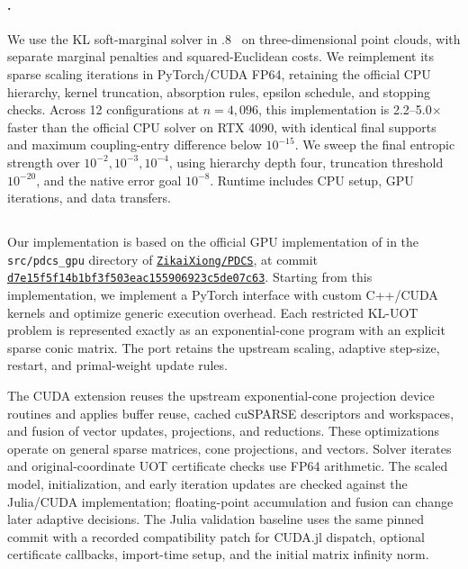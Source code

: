 \paragraph{\multiscaleot.}
We use the KL soft-marginal solver in .8~\citep{schmitzer2019stabilized} on three-dimensional point clouds, with separate marginal penalties and squared-Euclidean costs.
We reimplement its sparse scaling iterations in PyTorch/CUDA FP64, retaining the official CPU hierarchy, kernel truncation, absorption rules, epsilon schedule, and stopping checks.
Across 12 configurations at $n=4{,}096$, this implementation is 2.2--5.0$\times$ faster than the official CPU solver on RTX 4090, with identical final supports and maximum coupling-entry difference below $10^{-15}$.
We sweep the final entropic strength over $10^{-2},10^{-3},10^{-4}$, using hierarchy depth four, truncation threshold $10^{-20}$, and the native error goal $10^{-8}$.
Runtime includes CPU setup, GPU iterations, and data transfers.

\subsection{\pdcs}
\label{app:implementation-pdcs}
Our \pdcs implementation is based on the official GPU implementation of \citet{lin2025practical} in the \texttt{src/pdcs\_gpu} directory of \href{https://github.com/ZikaiXiong/PDCS}{\texttt{ZikaiXiong/PDCS}}, at commit \href{https://github.com/ZikaiXiong/PDCS/commit/d7e15f5f14b1bf3f503eac155906923c5de07c63}{\texttt{d7e15f5f14b1bf3f503eac155906923c5de07c63}}.
Starting from this implementation, we implement a PyTorch interface with custom C++/CUDA kernels and optimize generic execution overhead.
Each restricted KL-UOT problem is represented exactly as an exponential-cone program with an explicit sparse conic matrix.
The port retains the upstream scaling, adaptive step-size, restart, and primal-weight update rules.

The CUDA extension reuses the upstream exponential-cone projection device routines and applies buffer reuse, cached cuSPARSE descriptors and workspaces, and fusion of vector updates, projections, and reductions.
These optimizations operate on general sparse matrices, cone projections, and vectors.
Solver iterates and original-coordinate UOT certificate checks use FP64 arithmetic.
The scaled model, initialization, and early iteration updates are checked against the Julia/CUDA implementation; floating-point accumulation and fusion can change later adaptive decisions.
The Julia validation baseline uses the same pinned commit with a recorded compatibility patch for CUDA.jl dispatch, optional certificate callbacks, import-time setup, and the initial matrix infinity norm.

